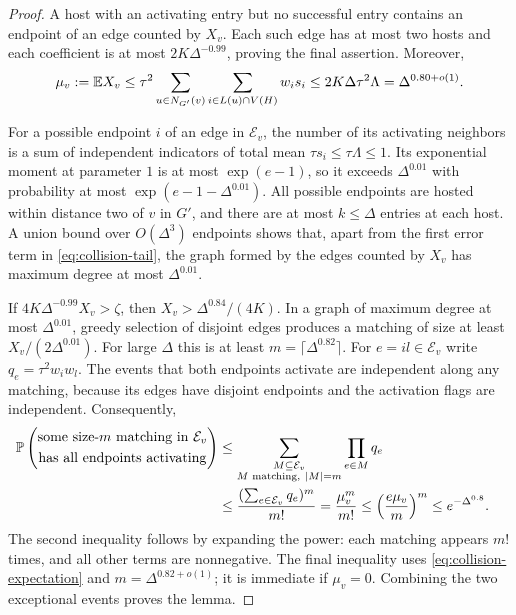 \begin{proof}
A host with an activating entry but no successful entry contains an
endpoint of an edge counted by $X_v$.  Each such edge has at most
two hosts and each coefficient is at most $2K\Delta^{-0.99}$, proving
the final assertion.  Moreover,
\begin{equation}\label{eq:collision-expectation}
 \mu_v:=\mathbb E X_v
 \le\tau^2\sum_{u\in N_{G'}(v)}
               \sum_{i\in L(u)\cap V(H)}w_is_i
 \le2K\Delta\tau^2\Lambda=\Delta^{0.80+o(1)}.
\end{equation}

For a possible endpoint $i$ of an edge in $\mathcal E_v$, the number
of its activating neighbors is a sum of independent indicators of
total mean $\tau s_i\le\tau\Lambda\le1$.  Its exponential moment at
parameter $1$ is at most $\exp(e-1)$, so it exceeds
$\Delta^{0.01}$ with probability at most
$\exp(e-1-\Delta^{0.01})$.  All possible endpoints are hosted within
distance two of $v$ in $G'$, and there are at most $k\le\Delta$ entries
at each host.  A union bound over $O(\Delta^3)$ endpoints shows that,
apart from the first error term in \eqref{eq:collision-tail}, the
graph formed by the edges counted by $X_v$ has maximum degree at
most $\Delta^{0.01}$.

If $4K\Delta^{-0.99}X_v>\zeta$, then
$X_v>\Delta^{0.84}/(4K)$.  In a graph of maximum degree at most
$\Delta^{0.01}$, greedy selection of disjoint edges produces a matching
of size at least $X_v/(2\Delta^{0.01})$.  For large $\Delta$ this is
at least $m=\lceil\Delta^{0.82}\rceil$.  For $e=il\in\mathcal E_v$
write $q_e=\tau^2w_iw_l$.  The events that both endpoints activate
are independent along any matching, because its edges have disjoint
endpoints and the activation flags are independent.  Consequently,
\begin{equation}\label{eq:collision-matching-tail}
 \begin{aligned}
 \PP\left(\begin{gathered}
     \text{some size-$m$ matching in $\mathcal E_v$}\\
     \text{has all endpoints activating}
   \end{gathered}\right)
 &\le\sum_{\substack{M\subseteq\mathcal E_v\\M\text{ matching},\ |M|=m}}
                      \prod_{e\in M}q_e\\
 &\le\frac{(\sum_{e\in\mathcal E_v}q_e)^m}{m!}
   =\frac{\mu_v^m}{m!}
   \le\left(\frac{e\mu_v}{m}\right)^m
   \le e^{-\Delta^{0.8}}.
 \end{aligned}
\end{equation}
The second inequality follows by expanding the power: each matching
appears $m!$ times, and all other terms are nonnegative.  The final
inequality uses \eqref{eq:collision-expectation} and
$m=\Delta^{0.82+o(1)}$; it is immediate if $\mu_v=0$.
Combining the two exceptional events proves the lemma.
\end{proof}

